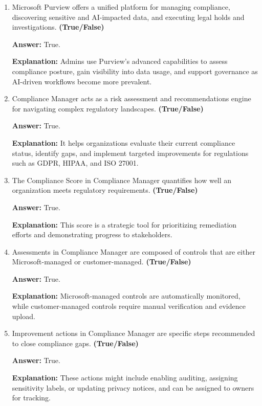 \documentclass[10pt]{article}
\begin{document}
\begin{enumerate}[leftmargin=*]

\item Microsoft Purview offers a unified platform for managing compliance, discovering sensitive and AI-impacted data, and executing legal holds and investigations. \textbf{(True/False)}

\textbf{Answer:} True.

\textbf{Explanation:} Admins use Purview’s advanced capabilities to assess compliance posture, gain visibility into data usage, and support governance as AI-driven workflows become more prevalent.

\item Compliance Manager acts as a risk assessment and recommendations engine for navigating complex regulatory landscapes. \textbf{(True/False)}

\textbf{Answer:} True.

\textbf{Explanation:} It helps organizations evaluate their current compliance status, identify gaps, and implement targeted improvements for regulations such as GDPR, HIPAA, and ISO 27001.

\item The Compliance Score in Compliance Manager quantifies how well an organization meets regulatory requirements. \textbf{(True/False)}

\textbf{Answer:} True.

\textbf{Explanation:} This score is a strategic tool for prioritizing remediation efforts and demonstrating progress to stakeholders.

\item Assessments in Compliance Manager are composed of controls that are either Microsoft-managed or customer-managed. \textbf{(True/False)}

\textbf{Answer:} True.

\textbf{Explanation:} Microsoft-managed controls are automatically monitored, while customer-managed controls require manual verification and evidence upload.

\item Improvement actions in Compliance Manager are specific steps recommended to close compliance gaps. \textbf{(True/False)}

\textbf{Answer:} True.

\textbf{Explanation:} These actions might include enabling auditing, assigning sensitivity labels, or updating privacy notices, and can be assigned to owners for tracking.


\end{enumerate}
\end{document}

